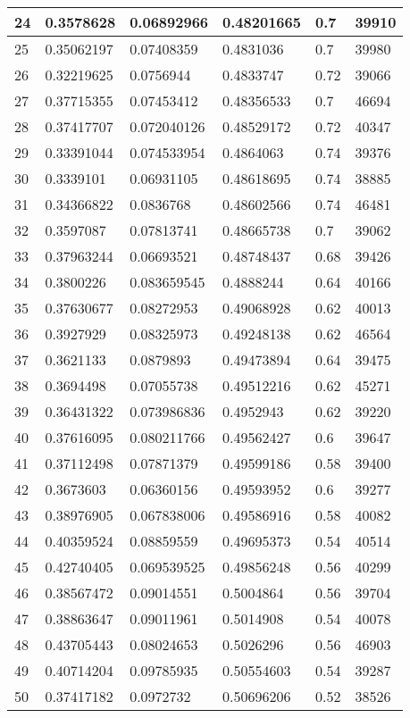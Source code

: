 \begin{longtable}{|l|l|l|l|l|l|}
24 & 0.3578628 & 0.06892966 & 0.48201665 & 0.7 & 39910 \\ \hline 
25 & 0.35062197 & 0.07408359 & 0.4831036 & 0.7 & 39980 \\ \hline 
26 & 0.32219625 & 0.0756944 & 0.4833747 & 0.72 & 39066 \\ \hline 
27 & 0.37715355 & 0.07453412 & 0.48356533 & 0.7 & 46694 \\ \hline 
28 & 0.37417707 & 0.072040126 & 0.48529172 & 0.72 & 40347 \\ \hline 
29 & 0.33391044 & 0.074533954 & 0.4864063 & 0.74 & 39376 \\ \hline 
30 & 0.3339101 & 0.06931105 & 0.48618695 & 0.74 & 38885 \\ \hline 
31 & 0.34366822 & 0.0836768 & 0.48602566 & 0.74 & 46481 \\ \hline 
32 & 0.3597087 & 0.07813741 & 0.48665738 & 0.7 & 39062 \\ \hline 
33 & 0.37963244 & 0.06693521 & 0.48748437 & 0.68 & 39426 \\ \hline 
34 & 0.3800226 & 0.083659545 & 0.4888244 & 0.64 & 40166 \\ \hline 
35 & 0.37630677 & 0.08272953 & 0.49068928 & 0.62 & 40013 \\ \hline 
36 & 0.3927929 & 0.08325973 & 0.49248138 & 0.62 & 46564 \\ \hline 
37 & 0.3621133 & 0.0879893 & 0.49473894 & 0.64 & 39475 \\ \hline 
38 & 0.3694498 & 0.07055738 & 0.49512216 & 0.62 & 45271 \\ \hline 
39 & 0.36431322 & 0.073986836 & 0.4952943 & 0.62 & 39220 \\ \hline 
40 & 0.37616095 & 0.080211766 & 0.49562427 & 0.6 & 39647 \\ \hline 
41 & 0.37112498 & 0.07871379 & 0.49599186 & 0.58 & 39400 \\ \hline 
42 & 0.3673603 & 0.06360156 & 0.49593952 & 0.6 & 39277 \\ \hline 
43 & 0.38976905 & 0.067838006 & 0.49586916 & 0.58 & 40082 \\ \hline 
44 & 0.40359524 & 0.08859559 & 0.49695373 & 0.54 & 40514 \\ \hline 
45 & 0.42740405 & 0.069539525 & 0.49856248 & 0.56 & 40299 \\ \hline 
46 & 0.38567472 & 0.09014551 & 0.5004864 & 0.56 & 39704 \\ \hline 
47 & 0.38863647 & 0.09011961 & 0.5014908 & 0.54 & 40078 \\ \hline 
48 & 0.43705443 & 0.08024653 & 0.5026296 & 0.56 & 46903 \\ \hline 
49 & 0.40714204 & 0.09785935 & 0.50554603 & 0.54 & 39287 \\ \hline 
50 & 0.37417182 & 0.0972732 & 0.50696206 & 0.52 & 38526 \\ \hline 
\end{longtable}